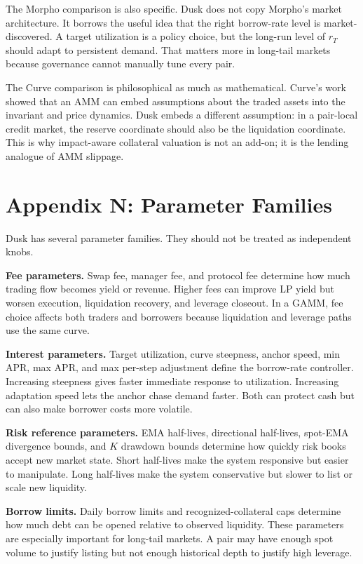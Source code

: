 \documentclass[11pt]{article}
\begin{document}
The Morpho comparison is also specific. Dusk does not copy Morpho's market architecture. It borrows the useful idea that the right borrow-rate level is market-discovered. A target utilization is a policy choice, but the long-run level of $r_T$ should adapt to persistent demand. That matters more in long-tail markets because governance cannot manually tune every pair.

The Curve comparison is philosophical as much as mathematical. Curve's work showed that an AMM can embed assumptions about the traded assets into the invariant and price dynamics. Dusk embeds a different assumption: in a pair-local credit market, the reserve coordinate should also be the liquidation coordinate. This is why impact-aware collateral valuation is not an add-on; it is the lending analogue of AMM slippage.

\section{Appendix N: Parameter Families}

Dusk has several parameter families. They should not be treated as independent knobs.

\textbf{Fee parameters.} Swap fee, manager fee, and protocol fee determine how much trading flow becomes yield or revenue. Higher fees can improve LP yield but worsen execution, liquidation recovery, and leverage closeout. In a GAMM, fee choice affects both traders and borrowers because liquidation and leverage paths use the same curve.

\textbf{Interest parameters.} Target utilization, curve steepness, anchor speed, min APR, max APR, and max per-step adjustment define the borrow-rate controller. Increasing steepness gives faster immediate response to utilization. Increasing adaptation speed lets the anchor chase demand faster. Both can protect cash but can also make borrower costs more volatile.

\textbf{Risk reference parameters.} EMA half-lives, directional half-lives, spot-EMA divergence bounds, and $K$ drawdown bounds determine how quickly risk books accept new market state. Short half-lives make the system responsive but easier to manipulate. Long half-lives make the system conservative but slower to list or scale new liquidity.

\textbf{Borrow limits.} Daily borrow limits and recognized-collateral caps determine how much debt can be opened relative to observed liquidity. These parameters are especially important for long-tail markets. A pair may have enough spot volume to justify listing but not enough historical depth to justify high leverage.
\end{document}
